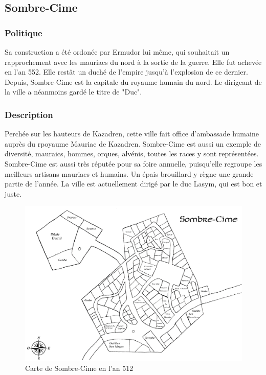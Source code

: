 \subsection{Sombre-Cime}
\subsubsection{Politique}
Sa construction a été ordonée par Ermudor lui même, qui souhaitait un rapprochement avec les mauriacs du nord à la sortie de la guerre. Elle fut achevée en l'an 552. Elle restât un duché de l'empire jusqu'à l'explosion de ce dernier.
\newline
Depuis, Sombre-Cime est la capitale du royaume humain du nord. Le dirigeant de la ville a néanmoins gardé le titre de "Duc".
\subsubsection{Description}
\hypertarget{sombrecime}{}Perchée sur les hauteurs de Kazadren, cette ville fait office d’ambassade humaine auprès du rpoyaume Mauriac de Kazadren. Sombre-Cime est aussi un exemple de diversité, mauraics, hommes, orques, alvénis, toutes les races y sont représentées. Sombre-Cime est aussi très réputée pour sa foire annuelle, puisqu’elle regroupe les meilleurs artisans mauriacs et humains. Un épais brouillard y règne une grande partie de l’année. La ville est actuellement dirigé par le duc Lasym, qui est bon et juste.
\begin{figure}
 \begin{center}
   \includegraphics[scale=1.14, angle=90]{./Ressources/medieval/Carte_sombre_cime.jpg}
   \caption{Carte de Sombre-Cime en l'an 512}
 \end{center}
\end{figure}

